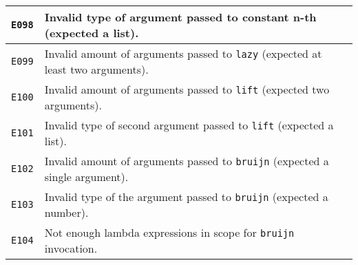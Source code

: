\begin{longtable}{ | p{6em} | p{34em} | }
\verb|E098|          & Invalid type of argument passed to constant n-th (expected a list).                                                                            \\ \hline
\verb|E099|          & Invalid amount of arguments passed to \verb|lazy| (expected at least two arguments).                                                           \\ \hline
\verb|E100|          & Invalid amount of arguments passed to \verb|lift| (expected two arguments).                                                                    \\ \hline
\verb|E101|          & Invalid type of second argument passed to \verb|lift| (expected a list).                                                                       \\ \hline
\verb|E102|          & Invalid amount of arguments passed to \verb|bruijn| (expected a single argument).                                                              \\ \hline
\verb|E103|          & Invalid type of the argument passed to \verb|bruijn| (expected a number).                                                                      \\ \hline
\verb|E104|          & Not enough lambda expressions in scope for \verb|bruijn| invocation.                                                                           \\ \hline
\end{longtable}

